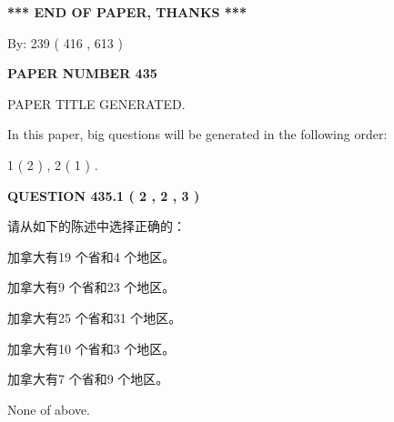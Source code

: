 \documentclass{ctexart}
\begin{document}
   
   
   
\vspace{1.0in} 
{\textbf{\large{ *** END OF PAPER, THANKS *** }}} 
   
   
\hspace{1.0in} By: 
 239 ( 416 ,  613 )
   
   
   
   
\newpage 
\setcounter{page}{ 
   435001 } 
   
   
   
   
 {\textbf{ \Large{ PAPER NUMBER  435  }}}
   
   
\vspace{0.2in}
   
   
   
   
   
   
   
   
 \vspace{0.2in}
 
 
 
 
   
   
 PAPER TITLE GENERATED.
   
   
   
\vspace{0.2in}
   
In this paper, big questions will be generated in the following order: 
   
   
   1 ( 2 )
 ,
   2 ( 1 )
 .
  
\vspace{0.2in}
  
{\textbf{\Large{QUESTION
435.1 
 ( 2 , 2 , 3 )
}}}
  
  
请从如下的陈述中选择正确的：
 
 
加拿大有19 个省和4 个地区。
 
 
加拿大有9 个省和23 个地区。
 
 
加拿大有25 个省和31 个地区。
 
 
加拿大有10 个省和3 个地区。
 
 
加拿大有7 个省和9 个地区。
 
 
 None of above.
 
 
\noindent{}
 
\end{document}
